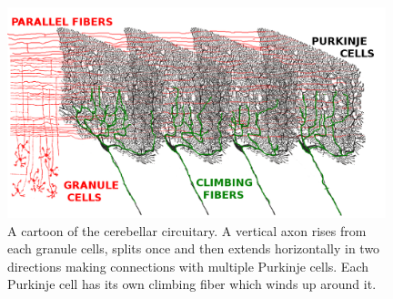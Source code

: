 \documentclass[12pt]{article}
\begin{document}
\begin{figure}
\begin{center}
\includegraphics[width=11cm]{cerebellum.png}
\end{center}
\caption{A cartoon of the cerebellar circuitary. A vertical axon rises
  from each granule cells, splits once and then extends horizontally
  in two directions making connections with multiple Purkinje
  cells. Each Purkinje cell has its own climbing fiber which winds up
  around it.\label{fig:cerebellum}}
\end{figure}
\end{document}
